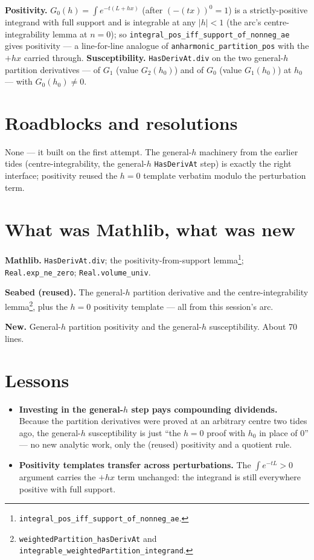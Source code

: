 \documentclass[11pt]{article}
\begin{document}
\textbf{Positivity.} $G_0(h)=\int e^{-t(L+hx)}$ (after $(-(tx))^0=1$) is a
strictly-positive integrand with full support and is integrable at any
$|h|<1$ (the arc's centre-integrability lemma at $n=0$); so
\texttt{integral\_pos\_iff\_support\_of\_nonneg\_ae} gives positivity --- a
line-for-line analogue of \texttt{anharmonic\_partition\_pos} with the $+hx$
carried through. \textbf{Susceptibility.} \texttt{HasDerivAt.div} on the two
general-$h$ partition derivatives --- of $G_1$ (value $G_2(h_0)$) and of $G_0$
(value $G_1(h_0)$) at $h_0$ --- with $G_0(h_0)\neq0$.

\section{Roadblocks and resolutions}

None --- it built on the first attempt. The general-$h$ machinery from the
earlier tides (centre-integrability, the general-$h$ \texttt{HasDerivAt} step)
is exactly the right interface; positivity reused the $h=0$ template verbatim
modulo the perturbation term.

\section{What was Mathlib, what was new}

\textbf{Mathlib.} \texttt{HasDerivAt.div}; the positivity-from-support
lemma\footnote{\texttt{integral\_pos\_iff\_support\_of\_nonneg\_ae}.};
\texttt{Real.exp\_ne\_zero}; \texttt{Real.volume\_univ}.

\textbf{Seabed (reused).} The general-$h$ partition derivative and the
centre-integrability lemma\footnote{\texttt{weightedPartition\_hasDerivAt}
and \texttt{integrable\_weightedPartition\_integrand}.}, plus the $h=0$
positivity template --- all from this session's arc.

\textbf{New.} General-$h$ partition positivity and the general-$h$
susceptibility. About 70 lines.

\section{Lessons}

\begin{itemize}[itemsep=3pt]
\item \textbf{Investing in the general-$h$ step pays compounding dividends.}
  Because the partition derivatives were proved at an arbitrary centre two
  tides ago, the general-$h$ susceptibility is just ``the $h=0$ proof with
  $h_0$ in place of $0$'' --- no new analytic work, only the (reused)
  positivity and a quotient rule.
\item \textbf{Positivity templates transfer across perturbations.} The
  $\int e^{-tL}>0$ argument carries the $+hx$ term unchanged: the integrand is
  still everywhere positive with full support.
\end{itemize}
\end{document}
